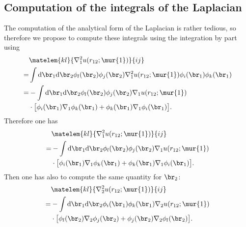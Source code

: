 \subsection{Computation of the integrals of the Laplacian }
The computation of the analytical form of the Laplacian is rather tedious, so therefore we propose to compute these integrals using the integration by part using 
\begin{equation}
 \begin{aligned}
&  \matelem{kl}{\nabla^2_1 u(r_{12};\mur{1})}{ij} \\ 
= & \int \text{d}\br_{1} \text{d}\br_{2}   \phi_l(\br_2) \phi_j(\br_2) \nabla^2_1 u(r_{12};\mur{1}) \phi_i(\br_1) \phi_k(\br_1) \\
= & -\int \text{d}\br_{1} \text{d}\br_{2}  \phi_l(\br_2) \phi_j(\br_2) \nabla_1 u(r_{12};\mur{1}) \\ & \cdot \big[ \phi_i(\br_1) \nabla_1 \phi_k(\br_1) +  \phi_k(\br_1) \nabla_1 \phi_i(\br_1)\big].
 \end{aligned}
\end{equation}
Therefore one has 
\begin{equation}
 \label{eq:lapl_1}
 \begin{aligned}
&  \matelem{kl}{\nabla^2_1 u(r_{12};\mur{1})}{ij} \\ 
= & -\int \text{d}\br_{1} \text{d}\br_{2}  \phi_l(\br_2) \phi_j(\br_2) \nabla_1 u(r_{12};\mur{1}) \\ & \cdot \big[ \phi_i(\br_1) \nabla_1 \phi_k(\br_1) +  \phi_k(\br_1) \nabla_1 \phi_i(\br_1)\big].
 \end{aligned}
\end{equation}
Then one has also to compute the same quantity for $\br_2$:
\begin{equation}
 \label{eq:lapl_2}
 \begin{aligned}
&  \matelem{kl}{\nabla^2_2 u(r_{12};\mur{1})}{ij} \\ 
= & -\int \text{d}\br_{1} \text{d}\br_{2} \phi_i(\br_1) \phi_k(\br_1) \nabla_2 u(r_{12};\mur{1}) \\ & \cdot \big[\phi_l(\br_2)  \nabla_2  \phi_j(\br_2) + \phi_j(\br_2)  \nabla_2  \phi_l(\br_2)   \big].
 \end{aligned}
\end{equation}

